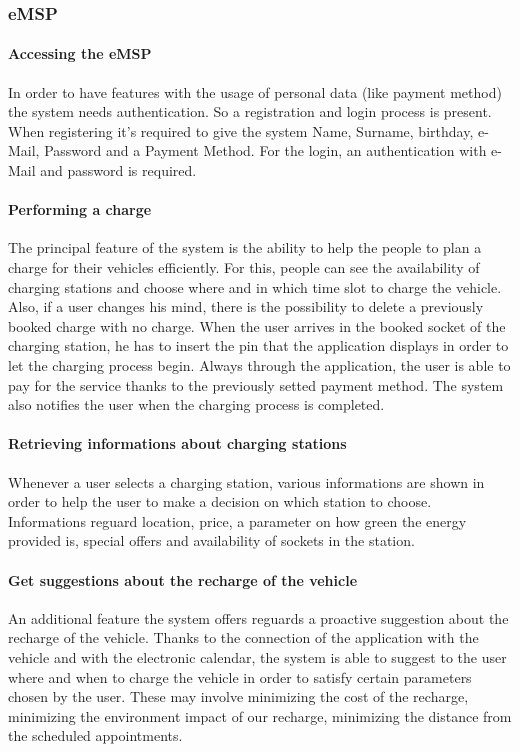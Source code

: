 \subsubsection{\ac{eMSP}}
\paragraph{Accessing the \ac{eMSP}}
In order to have features with the usage of personal data (like payment method) the system needs authentication. So a registration and login process is present. When registering it's required to give the system Name, Surname, birthday, e-Mail, Password and a Payment Method. For the login, an authentication with e-Mail and password is required.

\paragraph{Performing a charge}
The principal feature of the system is the ability to help the people to plan a charge for their vehicles efficiently. For this, people can see the availability of charging stations and choose where and in which time slot to charge the vehicle.
Also, if a user changes his mind, there is the possibility to delete a previously booked charge with no charge.
When the user arrives in the booked socket of the charging station, he has to insert the pin that the application displays in order to let the charging process begin.
Always through the application, the user is able to pay for the service thanks to the previously setted payment method.
The system also notifies the user when the charging process is completed.

\paragraph{Retrieving informations about charging stations}
Whenever a user selects a charging station, various informations are shown in order to help the user to make a decision on which station to choose. Informations reguard location, price, a parameter on how green the energy provided is, special offers and availability of sockets in the station.

\paragraph{Get suggestions about the recharge of the vehicle}
An additional feature the system offers reguards a proactive suggestion about the recharge of the vehicle. Thanks to the connection of the application with the vehicle and with the electronic calendar, the system is able to suggest to the user where and when to charge the vehicle in order to satisfy certain parameters chosen by the user. These may involve minimizing the cost of the recharge, minimizing the environment impact of our recharge, minimizing the distance from the scheduled appointments.


